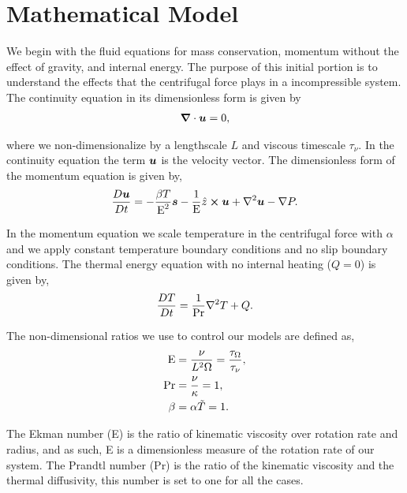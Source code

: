 \section{Mathematical Model}

We begin with the fluid equations for mass conservation, momentum without the effect of gravity, and internal energy. The purpose of this initial portion is to understand the effects that the centrifugal force plays in a incompressible system. The continuity equation in its dimensionless form is given by
\begin{align}
	\boldsymbol{\nabla} \cdot \boldsymbol{u} = 0,
\end{align}

where we non-dimensionalize by a lengthscale $L$ and viscous timescale $\tau_{\nu}$. In the continuity equation the term $\boldsymbol{u}$ is the velocity vector. The dimensionless form of the momentum equation is given by,
\begin{align}
	\frac{D \boldsymbol{u}}{D t} = -\frac{\beta T}{\text{E}^2} \boldsymbol{s} - \frac{1}{\text{E}} \hat{z} \cross \boldsymbol{u} + \nabla^2 \boldsymbol{u} - \nabla P.
\end{align}

In the momentum equation we scale temperature in the centrifugal force with $\alpha$ and we apply constant temperature boundary conditions and no slip boundary conditions. The thermal energy equation with no internal heating ($Q=0$) is given by, 
\begin{align}
	\frac{D T}{D t} = \frac{1}{\text{Pr}} \nabla^2 T + Q.
\end{align}

The non-dimensional ratios we use to control our models are defined as, 
\begin{align}
	\text{E} &= \frac{\nu}{L^2 \Omega} = \frac{\tau_{\Omega}}{\tau_{\nu}}, \\
	\text{Pr} &= \frac{\nu}{\kappa} = 1, \\
	\beta &= \alpha \tilde{T} = 1.
\end{align}

The Ekman number (E) is the ratio of kinematic viscosity over rotation rate and radius, and as such, E is a dimensionless measure of the rotation rate of our system. The Prandtl number (Pr) is the ratio of the kinematic viscosity and the thermal diffusivity, this number is set to one for all the cases. 

